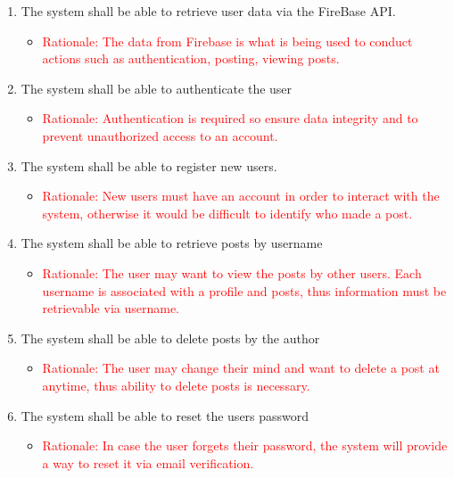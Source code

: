 \documentclass[12pt, titlepage]{article}
\begin{document}
\begin{enumerate}
    \item  The system shall be able to retrieve user data via the FireBase API.
        \begin{itemize}
            \item \textcolor{red}{Rationale: The data from Firebase is what is being used to conduct actions such as authentication, posting, viewing posts.}
            
        \end{itemize}
    \item The system shall be able to authenticate the user
        \begin{itemize}
            \item \textcolor{red}{Rationale: Authentication is required so ensure data integrity and to prevent unauthorized access to an account.}
        \end{itemize}
    \item The system shall be able to register new users.
        \begin{itemize}
            \item \textcolor{red}{Rationale: New users must have an account in order to interact with the system, otherwise it would be difficult to identify who made a post.}
        \end{itemize}
    \item The system shall be able to retrieve posts by username
        \begin{itemize}
            \item \textcolor{red}{ Rationale: The user may want to view the posts by other users. Each username is associated with a profile and posts, thus information must be retrievable via username.}
        \end{itemize}
    \item The system shall be able to delete posts by the author
        \begin{itemize}
            \item \textcolor{red}{Rationale: The user may change their mind and want to delete a post at anytime, thus ability to delete posts is necessary.}
        \end{itemize}
    \item The system shall be able to reset the users password
        \begin{itemize}
            \item \textcolor{red}{Rationale: In case the user forgets their password, the system will provide a way to reset it via email verification.}

\end{itemize}
\end{enumerate}
\end{document}
